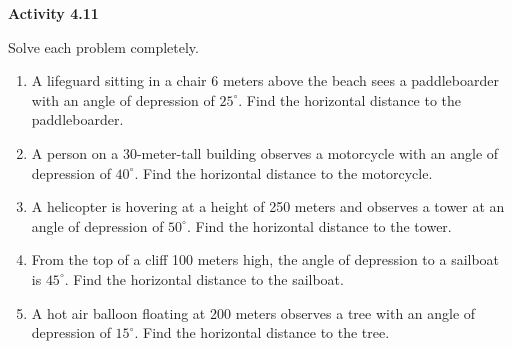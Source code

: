 \vspace{0.3ex}
\noindent\textbf{Activity 4.11}

\vspace{0.2ex}

Solve each problem completely.

\begin{enumerate}
    \item A lifeguard sitting in a chair 6 meters above the beach sees a paddleboarder with an angle of depression of \(25^\circ\). Find the horizontal distance to the paddleboarder.
    \item A person on a 30-meter-tall building observes a motorcycle with an angle of depression of \(40^\circ\). Find the horizontal distance to the motorcycle.
    \item A helicopter is hovering at a height of 250 meters and observes a tower at an angle of depression of \(50^\circ\). Find the horizontal distance to the tower.
    \item From the top of a cliff 100 meters high, the angle of depression to a sailboat is \(45^\circ\). Find the horizontal distance to the sailboat.
    \item A hot air balloon floating at 200 meters observes a tree with an angle of depression of \(15^\circ\). Find the horizontal distance to the tree.
\end{enumerate}
